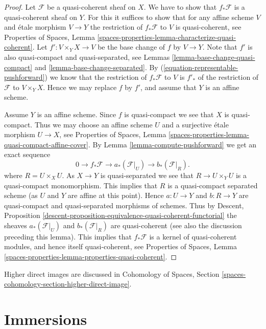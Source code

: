 \begin{proof}
Let $\mathcal{F}$ be a quasi-coherent sheaf on $X$. We have to show that
$f_*\mathcal{F}$ is a quasi-coherent sheaf on $Y$. For this it suffices
to show that for any affine scheme $V$ and \'etale morphism $V \to Y$
the restriction of $f_*\mathcal{F}$ to $V$ is quasi-coherent, see
Properties of Spaces,
Lemma \ref{spaces-properties-lemma-characterize-quasi-coherent}.
Let $f' : V \times_Y X \to V$
be the base change of $f$ by $V \to Y$. Note that $f'$ is also
quasi-compact and quasi-separated, see
Lemmas \ref{lemma-base-change-quasi-compact} and
\ref{lemma-base-change-separated}.
By (\ref{equation-representable-pushforward})
we know that the restriction of $f_*\mathcal{F}$ to $V$ is $f'_*$ of the
restriction of $\mathcal{F}$ to $V \times_Y X$. Hence
we may replace $f$ by $f'$, and assume that $Y$ is an affine scheme.

\medskip\noindent
Assume $Y$ is an affine scheme. Since $f$ is quasi-compact we see that $X$
is quasi-compact. Thus we may choose an affine scheme $U$ and a surjective
\'etale morphism $U \to X$, see
Properties of Spaces,
Lemma \ref{spaces-properties-lemma-quasi-compact-affine-cover}.
By Lemma \ref{lemma-compute-pushforward} we get an exact sequence
$$
0 \to f_*\mathcal{F} \to a_*(\mathcal{F}|_U) \to b_*(\mathcal{F}|_R).
$$
where $R = U \times_X U$.
As $X \to Y$ is quasi-separated we see that $R \to U \times_Y U$
is a quasi-compact monomorphism. This implies that $R$ is a quasi-compact
separated scheme (as $U$ and $Y$ are affine at this point).
Hence $a : U \to Y$ and $b : R \to Y$ are quasi-compact and
quasi-separated morphisms of schemes. Thus by
Descent,
Proposition \ref{descent-proposition-equivalence-quasi-coherent-functorial}
the sheaves $a_*(\mathcal{F}|_U)$ and $b_*(\mathcal{F}|_R)$
are quasi-coherent (see also the discussion preceding this lemma).
This implies that $f_*\mathcal{F}$ is a kernel of
quasi-coherent modules, and hence itself quasi-coherent, see
Properties of Spaces,
Lemma \ref{spaces-properties-lemma-properties-quasi-coherent}.
\end{proof}

\noindent
Higher direct images are discussed in
Cohomology of Spaces, Section
\ref{spaces-cohomology-section-higher-direct-image}.









\section{Immersions}
\label{section-immersions}

